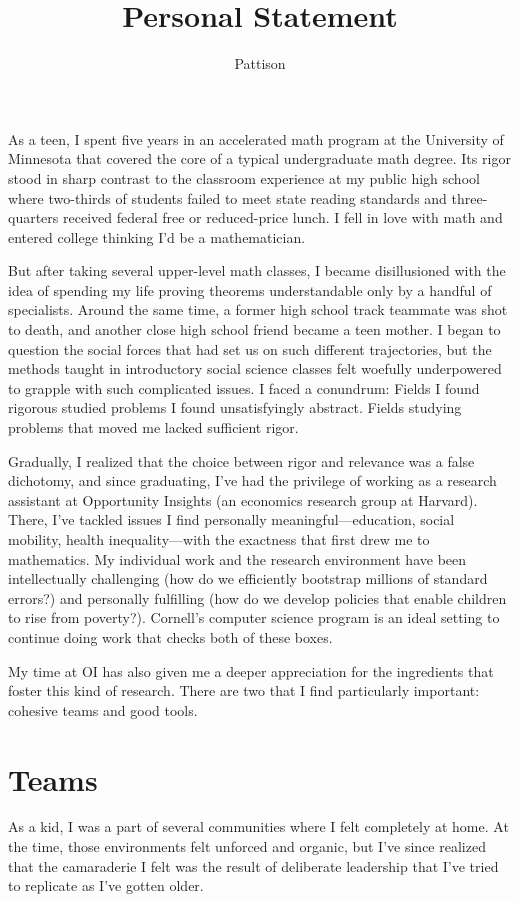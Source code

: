 \documentclass{grad-statement}
\title{Personal Statement}
\author{Pattison}
\begin{document}
\noindent
As a teen, I spent five years in an accelerated math program at the University of Minnesota that covered the core of a typical undergraduate math degree.
Its rigor stood in sharp contrast to the classroom experience at my public high school where two-thirds of students failed to meet state reading standards and three-quarters received federal free or reduced-price lunch.
I fell in love with math and entered college thinking I'd be a mathematician.

But after taking several upper-level math classes, I became disillusioned with the idea of spending my life proving theorems understandable only by a handful of specialists.
Around the same time, a former high school track teammate was shot to death, and another close high school friend became a teen mother.
I began to question the social forces that had set us on such different trajectories, but the methods taught in introductory social science classes felt woefully underpowered to grapple with such complicated issues.
I faced a conundrum:
Fields I found rigorous studied problems I found unsatisfyingly abstract.
Fields studying problems that moved me lacked sufficient rigor.

Gradually, I realized that the choice between rigor and relevance was a false dichotomy, and since graduating, I've had the privilege of working as a research assistant at Opportunity Insights (an economics research group at Harvard).
There, I've tackled issues I find personally meaningful---education, social mobility, health inequality---with the exactness that first drew me to mathematics.
My individual work and the research environment have been intellectually challenging (how do we efficiently bootstrap millions of standard errors?) and personally fulfilling (how do we develop policies that enable children to rise from poverty?).
Cornell's computer science program is an ideal setting to continue doing work that checks both of these boxes.

\medskip

My time at OI has also given me a deeper appreciation for the ingredients that foster this kind of research.
There are two that I find particularly important: cohesive teams and good tools.

\section{Teams}

As a kid, I was a part of several communities where I felt completely at home.
At the time, those environments felt unforced and organic, but I've since realized that the camaraderie I felt was the result of deliberate leadership that I've tried to replicate as I've gotten older.
\end{document}
